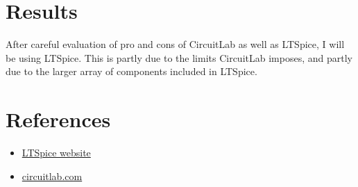 \documentclass{article}
\begin{document}
\section{Results}
After careful evaluation of pro and cons of CircuitLab as well as LTSpice, I will be using LTSpice. This is partly due to the limits CircuitLab imposes, and partly due to the larger array of components included in LTSpice.


\section*{References}
\renewcommand{\theenumi}{\arabic{enumi}}
\begin{itemize}
	\item \href{https://www.analog.com/en/design-center/design-tools-and-calculators/ltspice-simulator.html}{LTSpice website}
	\item \href{https://www.circuitlab.com/}{circuitlab.com}
\end{itemize}


\end{document}
